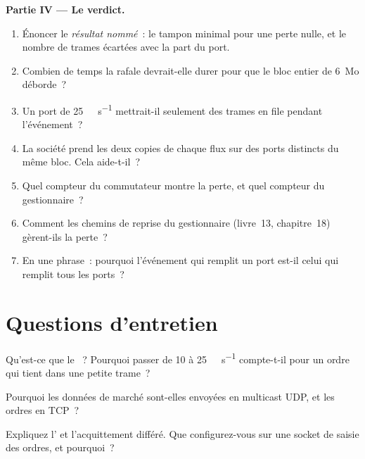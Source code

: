 \begin{problem}
\medskip\noindent\textbf{Partie IV --- Le verdict.}
\begin{enumerate}[resume]
\item Énoncer le \emph{résultat nommé}~: le tampon minimal pour une perte nulle, et le nombre de trames écartées avec la part du port.
\item Combien de temps la rafale devrait-elle durer pour que le bloc entier de 6~Mo déborde~?
\item Un port de \qty{25}{\giga\bit\per\second} mettrait-il seulement des trames en file pendant l'événement~?
\item La société prend les deux copies de chaque flux sur des ports distincts du même bloc. Cela aide-t-il~?
\item Quel compteur du commutateur montre la perte, et quel compteur du gestionnaire~?
\item Comment les chemins de reprise du gestionnaire (livre~13, chapitre~18) gèrent-ils la perte~?
\item En une phrase~: pourquoi l'événement qui remplit un port est-il celui qui remplit tous les ports~?
\end{enumerate}
\end{problem}

\section{Questions d'entretien}

\begin{interviewq}\label{iq:nw:networking-for-trading:1}
Qu'est-ce que le ~? Pourquoi passer de 10 à \qty{25}{\giga\bit\per\second} compte-t-il pour un ordre qui tient dans une petite
trame~?
\end{interviewq}

\begin{interviewq}\label{iq:nw:networking-for-trading:2}
Pourquoi les données de marché sont-elles envoyées en multicast UDP, et les ordres en TCP~?
\end{interviewq}

\begin{interviewq}\label{iq:nw:networking-for-trading:3}
Expliquez l' et l'acquittement différé. Que configurez-vous sur une socket de saisie des ordres, et pourquoi~?
\end{interviewq}

